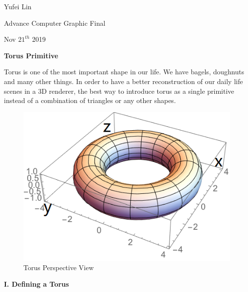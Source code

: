 \documentclass[a4paper,12pt]{report}
\begin{document}
\noindent
Yufei Lin

\noindent
Advance Computer Graphic Final

\noindent
Nov \(21^{th}\) 2019

\begin{center}
\textbf{Torus Primitive}
\end{center}

Torus is one of the most important shape in our life. We have bagels, doughnuts and many other things. In order to have a better reconstruction of our daily life scenes in a 3D renderer, the best way to introduce torus as a single primitive instead of a combination of triangles or any other shapes. 

\begin{figure}[h]
\centering
\includegraphics[scale=1]{./Pic/Torus1.png}
\caption{Torus Perspective View}
\end{figure}

\noindent
\textbf{I. Defining a Torus}
\end{document}
